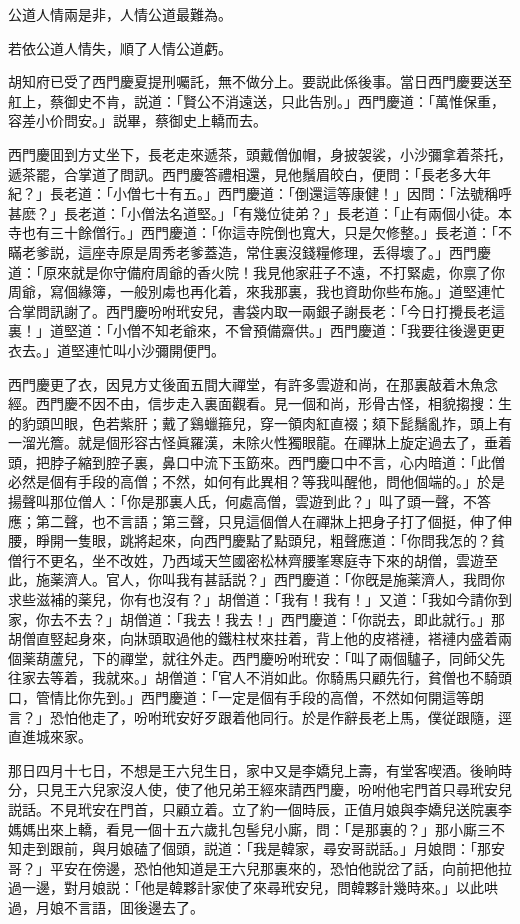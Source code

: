 公道人情兩是非，人情公道最難為。

若依公道人情失，順了人情公道虧。

胡知府已受了西門慶夏提刑囑託，無不做分上。要説此係後事。當日西門慶要送至舡上，蔡御史不肯，説道：「賢公不消遠送，只此告別。」西門慶道：「萬惟保重，容差小价問安。」説畢，蔡御史上轎而去。

西門慶囬到方丈坐下，長老走來遞茶，頭戴僧伽帽，身披袈裟，小沙彌拿着茶托，遞茶罷，合掌道了問訊。西門慶答禮相還，見他鬚眉皎白，便問：「長老多大年紀？」長老道：「小僧七十有五。」西門慶道：「倒還這等康健！」因問：「法號稱呼甚麽？」長老道：「小僧法名道堅。」「有幾位徒弟？」長老道：「止有兩個小徒。本寺也有三十餘僧行。」西門慶道：「你這寺院倒也寬大，只是欠修整。」長老道：「不瞞老爹説，這座寺原是周秀老爹蓋造，常住裏沒錢糧修理，丢得壞了。」西門慶道：「原來就是你守備府周爺的香火院！我見他家莊子不遠，不打緊處，你禀了你周爺，寫個緣簿，一般別䖏也再化着，來我那裏，我也資助你些布施。」道堅連忙合掌問訊謝了。西門慶吩咐玳安兒，書袋内取一兩銀子謝長老：「今日打攪長老這裏！」道堅道：「小僧不知老爺來，不曾預備齋供。」西門慶道：「我要往後邊更更衣去。」道堅連忙叫小沙彌開便門。

西門慶更了衣，因見方丈後面五間大禪堂，有許多雲遊和尚，在那裏敲着木魚念經。西門慶不因不由，信步走入裏面觀看。見一個和尚，形骨古怪，相貌搊搜：生的豹頭凹眼，色若紫肝；戴了鷄蠟箍兒，穿一領肉紅直裰；頦下髭鬚亂拃，頭上有一溜光簷。就是個形容古怪眞羅漢，未除火性獨眼龍。在禪牀上旋定過去了，垂着頭，把脖子縮到腔子裏，鼻口中流下玉筯來。西門慶口中不言，心内暗道：「此僧必然是個有手段的高僧；不然，如何有此異相？等我叫醒他，問他個端的。」於是揚聲叫那位僧人：「你是那裏人氏，何處高僧，雲遊到此？」叫了頭一聲，不答應；第二聲，也不言語；第三聲，只見這個僧人在禪牀上把身子打了個挺，伸了伸腰，睜開一隻眼，跳將起來，向西門慶點了點頭兒，粗聲應道：「你問我怎的？貧僧行不更名，坐不改姓，乃西域天竺國密松林齊腰峯寒庭寺下來的胡僧，雲遊至此，施薬濟人。官人，你叫我有甚話説？」西門慶道：「你旣是施薬濟人，我問你求些滋補的薬兒，你有也沒有？」胡僧道：「我有！我有！」又道：「我如今請你到家，你去不去？」胡僧道：「我去！我去！」西門慶道：「你説去，即此就行。」那胡僧直竪起身來，向牀頭取過他的鐵柱杖來拄着，背上他的皮褡褳，褡褳内盛着兩個薬葫蘆兒，下的禪堂，就往外走。西門慶吩咐玳安：「叫了兩個驢子，同師父先往家去等着，我就來。」胡僧道：「官人不消如此。你騎馬只顧先行，貧僧也不騎頭口，管情比你先到。」西門慶道：「一定是個有手段的高僧，不然如何開這等朗言？」恐怕他走了，吩咐玳安好歹跟着他同行。於是作辭長老上馬，僕従跟隨，逕直進城來家。

那日四月十七日，不想是王六兒生日，家中又是李嬌兒上壽，有堂客喫酒。後晌時分，只見王六兒家沒人使，使了他兄弟王經來請西門慶，吩咐他宅門首只尋玳安兒説話。不見玳安在門首，只顧立着。立了約一個時辰，正值月娘與李嬌兒送院裏李媽媽出來上轎，看見一個十五六歲扎包髻兒小廝，問：「是那裏的？」那小廝三不知走到跟前，與月娘磕了個頭，説道：「我是韓家，尋安哥説話。」月娘問：「那安哥？」平安在傍邊，恐怕他知道是王六兒那裏來的，恐怕他説岔了話，向前把他拉過一邊，對月娘説：「他是韓夥計家使了來尋玳安兒，問韓夥計幾時來。」以此哄過，月娘不言語，囬後邊去了。

